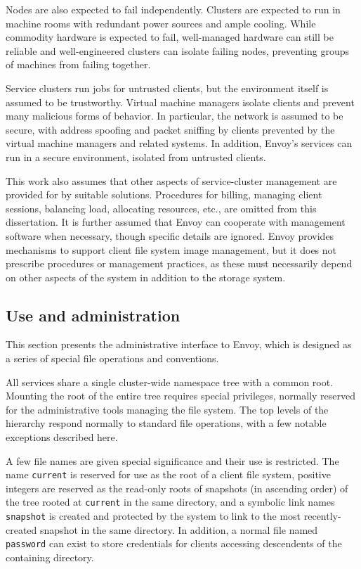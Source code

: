 Nodes are also expected to fail independently. Clusters are expected to run in machine rooms with redundant power sources and ample cooling. While commodity hardware is expected to fail, well-managed hardware can still be reliable and well-engineered clusters can isolate failing nodes, preventing groups of machines from failing together.

Service clusters run jobs for untrusted clients, but the environment itself is assumed to be trustworthy. Virtual machine managers isolate clients and prevent many malicious forms of behavior. In particular, the network is assumed to be secure, with address spoofing and packet sniffing by clients prevented by the virtual machine managers and related systems. In addition, Envoy's services can run in a secure environment, isolated from untrusted clients.

This work also assumes that other aspects of service-cluster management are provided for by suitable solutions. Procedures for billing, managing client sessions, balancing load, allocating resources, etc., are omitted from this dissertation. It is further assumed that Envoy can cooperate with management software when necessary, though specific details are ignored. Envoy provides mechanisms to support client file system image management, but it does not prescribe procedures or management practices, as these must necessarily depend on other aspects of the system in addition to the storage system.

\subsection{Use and administration}

This section presents the administrative interface to Envoy, which is designed as a series of special file operations and conventions.

All services share a single cluster-wide namespace tree with a common root. Mounting the root of the entire tree requires special privileges, normally reserved for the administrative tools managing the file system. The top levels of the hierarchy respond normally to standard file operations, with a few notable exceptions described here.

A few file names are given special significance and their use is restricted. The name \texttt{current} is reserved for use as the root of a client file system, positive integers are reserved as the read-only roots of snapshots (in ascending order) of the tree rooted at \texttt{current} in the same directory, and a symbolic link names \texttt{snapshot} is created and protected by the system to link to the most recently-created snapshot in the same directory. In addition, a normal file named \texttt{password} can exist to store credentials for clients accessing descendents of the containing directory.

